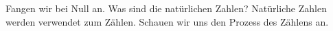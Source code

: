 \documentclass[11pt,a4paper,leqno]{report}
\newtheorem{definition}[theorem]{Definition}
\numberwithin{equation}{chapter}
\begin{document}
\\
\\
Fangen wir bei Null an. Was sind die natürlichen Zahlen? Natürliche Zahlen werden verwendet zum Zählen. Schauen wir uns den Prozess des Zählens an. 
\end{document}
